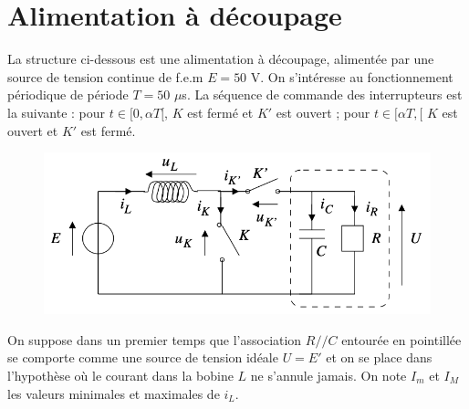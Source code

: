 \documentclass{report}
\begin{document}
\section*{Alimentation à découpage}

La structure ci-dessous est une alimentation à découpage, alimentée par une source de tension continue de f.e.m $E=50$ V. On s'intéresse au fonctionnement périodique de période $T=50$ $\mu$s. La séquence de commande des interrupteurs est la suivante : pour $t\in[0,\alpha T[$, $K$ est fermé et $K'$ est ouvert ; pour $t\in[\alpha T, [$ $K$ est ouvert et $K'$ est fermé.

\begin{figure}[h!]
	\centering
		\includegraphics[scale=0.9]{circuit1.png}
\end{figure}	

On suppose dans un premier temps que l'association $R//C$ entourée en pointillée se comporte comme une source de tension idéale $U=E'$ et on se place dans l'hypothèse où le courant dans la bobine $L$ ne s'annule jamais. On note $I_m$ et $I_M$ les valeurs minimales et maximales de $i_L$.
\end{document}
